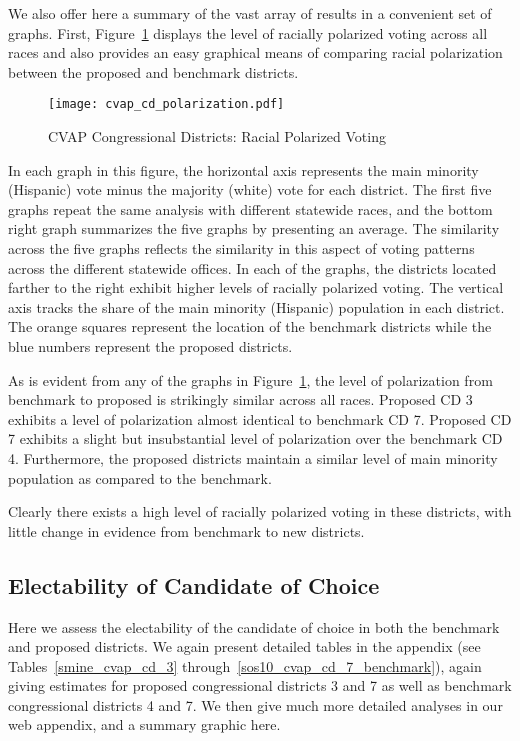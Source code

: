 \documentclass[12pt,draft]{scrartcl}
\begin{document}
We also offer here a summary of the vast array of results in a
convenient set of graphs.  First, Figure~\ref{cvap_cd_polarization}
displays the level of racially polarized voting across all races and
also provides an easy graphical means of comparing racial polarization
between the proposed and benchmark districts.
\begin{figure}[p!h]
  \begin{centering}
    \texttt{[image: cvap\_cd\_polarization.pdf]}
    \caption{CVAP Congressional Districts: Racial Polarized Voting}
  \end{centering}
  \label{cvap_cd_polarization}
\end{figure}

In each graph in this figure, the horizontal axis represents the main
minority (Hispanic) vote minus the majority (white) vote for each
district.  The first five graphs repeat the same analysis with
different statewide races, and the bottom right graph summarizes the
five graphs by presenting an average.  The similarity across the five
graphs reflects the similarity in this aspect of voting patterns
across the different statewide offices.  In each of the graphs, the
districts located farther to the right exhibit higher levels of
racially polarized voting. The vertical axis tracks the share of the
main minority (Hispanic) population in each district. The orange
squares represent the location of the benchmark districts while the
blue numbers represent the proposed districts.

As is evident from any of the graphs in
Figure~\ref{cvap_cd_polarization}, the level of polarization from
benchmark to proposed is strikingly similar across all races. Proposed
CD 3 exhibits a level of polarization almost identical to benchmark CD
7. Proposed CD 7 exhibits a slight but insubstantial level of
polarization over the benchmark CD 4.  Furthermore, the proposed
districts maintain a similar level of main minority population as
compared to the benchmark.

Clearly there exists a high level of racially polarized voting in
these districts, with little change in evidence from benchmark to new
districts.

\subsection{Electability of Candidate of Choice}

Here we assess the electability of the candidate of choice in both the
benchmark and proposed districts.  We again present detailed tables in
the appendix (see Tables~\ref{smine_cvap_cd_3}
through~\ref{sos10_cvap_cd_7_benchmark}), again giving estimates for
proposed congressional districts 3 and 7 as well as benchmark
congressional districts 4 and 7.  We then give much more detailed
analyses in our web appendix, and a summary graphic here.
\end{document}
